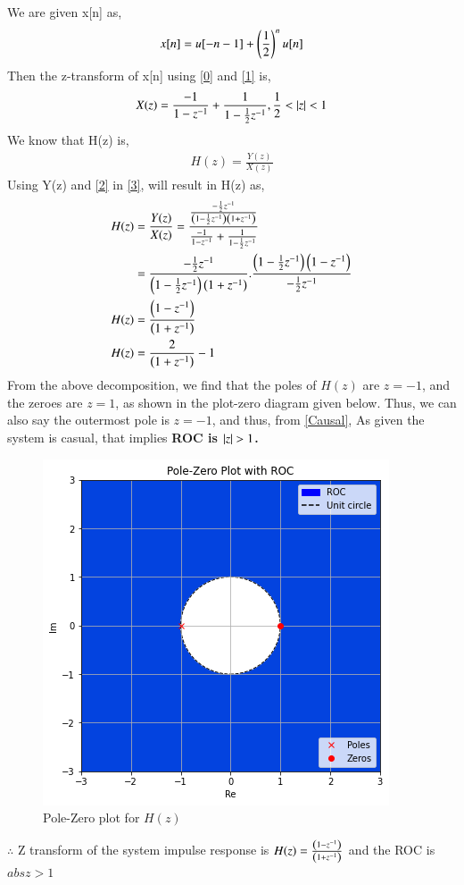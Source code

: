 \documentclass[journal,12pt,twocolumn]{IEEEtran}
\begin{document}
We are given x[n] as,
\begin{align}
    x[n]=u[-n-1]+\left(\frac{1}{2}\right)^n u[n]
\end{align}
Then the z-transform of x[n] using \eqref{0} and \eqref{1} is,
\begin{align}
    X(z)=\frac{-1}{1-z^{-1}}+\frac{1}{1-\frac{1}{2}z^{-1}},\frac{1}{2}<\vert z\vert<1\label{2}
\end{align}
We know that H(z) is,
\begin{align}
    H(z)=\frac{Y(z)}{X(z)}\label{3}
\end{align}
Using Y(z) and \eqref{2} in \eqref{3}, will result in H(z) as,
\begin{align}
    H(z)&=\frac{Y(z)}{X(z)}=\frac{\frac{-\frac{1}{2}z^{-1}}{\left(1-\frac{1}{2}z^{-1}\right)\left(1+z^{-1}\right)}}{\frac{-1}{1-z^{-1}}+\frac{1}{1-\frac{1}{2}z^{-1}}}\\
  \nonumber  &=\frac{-\frac{1}{2}z^{-1}}{\left(1-\frac{1}{2}z^{-1}\right)\left(1+z^{-1}\right)}.\frac{\left(1-\frac{1}{2}z^{-1}\right)\left(1-z^{-1}\right)}{-\frac{1}{2}z^{-1}}\\
  \nonumber H(z)&= \frac{\left(1-z^{-1}\right)}{\left(1+z^{-1}\right)}\\
  H(z)&=\frac{{2}}{\left(1+z^{-1}\right)}-1
\end{align}
From the above decomposition, we find that the poles of $H(z)$ are $z = -1$, and the zeroes are $z = 1$, as shown in the plot-zero diagram given below.
Thus, we can also say the outermost pole is $z = -1$, and thus, from \eqref{Causal}, As given the system is casual, that implies \textbf{ROC is $\vert z\vert > 1$.}

\begin{figure}[!htp]
    \centering
    \includegraphics[width=\columnwidth]{1.png}
    \caption{Pole-Zero plot for $H(z)$ }
    \label{f0}
\end{figure}

$\therefore$ Z transform of the system impulse response is $H(z)=\frac{\left(1-z^{-1}\right)}{\left(1+z^{-1}\right)}$ and the ROC is $abs{z} > 1$
\end{document}
